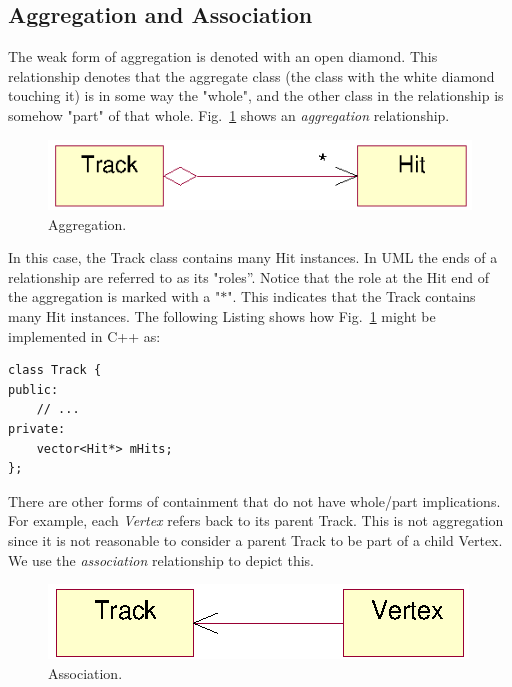\documentclass[twoside]{article}
\newcommand{\name}[1]{\textsl{#1}}%
\begin{document}
\subsection{Aggregation and Association}

The weak form of aggregation is denoted with an open diamond. This
relationship denotes that the aggregate class (the class with the
white diamond touching it) is in some way the "whole", and the other
class in the relationship is somehow "part" of that whole.
Fig.~\ref{fig:umlAggregation} shows an \emph{aggregation}
relationship.
\begin{figure}[htb]
    \begin{center}
        \includegraphics{umlAggregation.eps}
        \caption{Aggregation.}
        \label{fig:umlAggregation}
    \end{center}
\end{figure}
In this case, the Track class contains many Hit instances. In UML the
ends of a relationship are referred to as its "roles''. Notice that
the role at the Hit end of the aggregation is marked with a "$*$".
This indicates that the Track contains many Hit instances.  The
following Listing shows how Fig.~\ref{fig:umlAggregation} might be
implemented in C++ as:

{\footnotesize
\begin{verbatim}
class Track {
public:
    // ...
private:
    vector<Hit*> mHits;
};
\end{verbatim}
}%

There are other forms of containment that do not have whole/part
implications. For example, each \name{Vertex} refers back to its
parent Track. This is not aggregation since it is not reasonable to
consider a parent Track to be part of a child Vertex. We use the
\emph{association} relationship to depict this.

\begin{figure}[htb]
    \begin{center}
        \includegraphics{umlAssociation.eps}
        \caption{Association.}
        \label{fig:umlAssociation}
    \end{center}
\end{figure}
\end{document}
